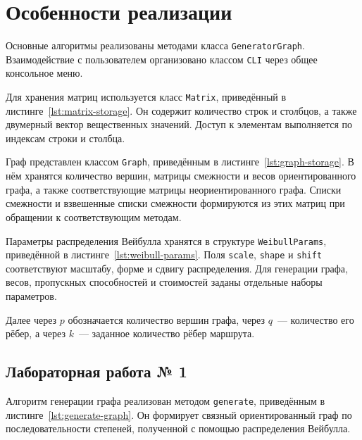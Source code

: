\section{Особенности реализации}

Основные алгоритмы реализованы методами класса \texttt{GeneratorGraph}. Взаимодействие с пользователем организовано классом \texttt{CLI} через общее консольное меню.

Для хранения матриц используется класс \texttt{Matrix}, приведённый в листинге~\ref{lst:matrix-storage}. Он содержит количество строк и столбцов, а также двумерный вектор вещественных значений. Доступ к элементам выполняется по индексам строки и столбца.


Граф представлен классом \texttt{Graph}, приведённым в листинге~\ref{lst:graph-storage}. В нём хранятся количество вершин, матрицы смежности и весов ориентированного графа, а также соответствующие матрицы неориентированного графа. Списки смежности и взвешенные списки смежности формируются из этих матриц при обращении к соответствующим методам.


\newpage

Параметры распределения Вейбулла хранятся в структуре \texttt{WeibullParams}, приведённой в листинге~\ref{lst:weibull-params}. Поля \texttt{scale}, \texttt{shape} и \texttt{shift} соответствуют масштабу, форме и сдвигу распределения. Для генерации графа, весов, пропускных способностей и стоимостей заданы отдельные наборы параметров.


Далее через $p$ обозначается количество вершин графа, через $q$~--- количество его рёбер, а через $k$~--- заданное количество рёбер маршрута.

\subsection{Лабораторная работа № 1}

Алгоритм генерации графа реализован методом \texttt{generate}, приведённым в листинге~\ref{lst:generate-graph}. Он формирует связный ориентированный граф по последовательности степеней, полученной с помощью распределения Вейбулла.

